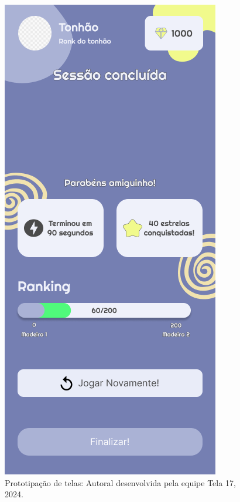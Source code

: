 \documentclass[12pt, openany, oneside, a4paper, english, brazil]{abntex2}   %
\begin{document}
\begin{figure}
    \centering
    \includegraphics[scale=0.7]{figuras/Math.Pow App/Sesson Ending.png}
    \caption{Prototipação de telas: Autoral desenvolvida pela equipe Tela 17, 2024.}
    \label{fig:nome-da-imagem}
\end{figure}
\end{document}
